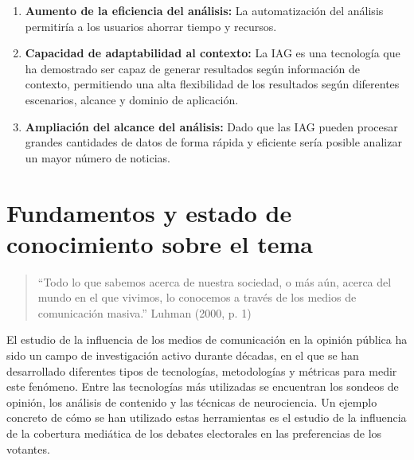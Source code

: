 \documentclass[12pt]{article}
\begin{document}
\begin{enumerate}
    \item \textbf{Aumento de la eficiencia del análisis:} La automatización del análisis permitiría a los usuarios ahorrar tiempo y recursos. 

    \item \textbf{Capacidad de adaptabilidad al contexto:} La IAG es una tecnología que ha demostrado ser capaz de generar resultados según información de contexto, permitiendo una alta flexibilidad de los resultados según diferentes escenarios, alcance y dominio de aplicación. 

    \item \textbf{Ampliación del alcance del análisis:} Dado que las IAG pueden procesar grandes cantidades de datos de forma rápida y eficiente sería posible analizar un mayor número de noticias.

\end{enumerate}


\section{Fundamentos y estado de conocimiento sobre el tema}

 \begin{quote}
     ``Todo lo que sabemos acerca de nuestra sociedad, o más aún, acerca del mundo en el que vivimos, lo conocemos a través de los medios de comunicación masiva.''  Luhman (2000, p. 1) \cite{luhmann2000}
 \end{quote}

%


El estudio de la influencia de los medios de comunicación en la opinión pública ha sido un campo de investigación activo durante décadas, en el que se han desarrollado diferentes tipos de tecnologías, metodologías y métricas para medir este fenómeno. Entre las tecnologías más utilizadas se encuentran los sondeos de opinión, los análisis de contenido y las técnicas de neurociencia. Un ejemplo concreto de cómo se han utilizado estas herramientas es el estudio de la influencia de la cobertura mediática de los debates electorales en las preferencias de los votantes. 
\end{document}
